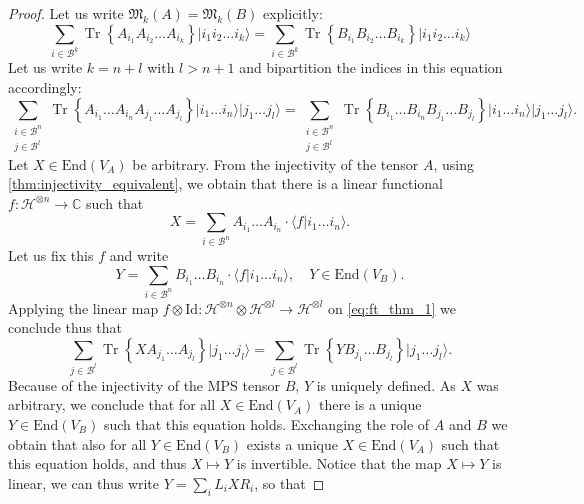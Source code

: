 \documentclass{article}
\newcommand{\tr}{\operatorname{Tr}}
\newcommand{\id}{\mathrm{Id}}
\newcommand{\End}{\mathrm{End}}
\newcommand{\ket}[1]{\vert #1 \rangle}
\newcommand{\scalprod}[2]{\langle #1 \vert #2 \rangle}
\begin{document}
\begin{proof}
  Let us write $\mathfrak{M}_k(A) = \mathfrak{M}_k(B)$ explicitly:
  \begin{equation*}
    \sum_{i\in \mathcal{B}^k} \tr\left\{A_{i_1} A_{i_2} \dots A_{i_k}\right\} \ket{i_1 i_2 \dots i_k} = 
    \sum_{i\in \mathcal{B}^k} \tr\left\{B_{i_1} B_{i_2} \dots B_{i_k}\right\} \ket{i_1 i_2 \dots i_k}
  \end{equation*}
  Let us write $k = n+l$ with $l>n+1$ and bipartition the indices in this equation accordingly:
  \begin{equation}\label{eq:ft_thm_1}
    \sum_{\substack{i\in \mathcal{B}^n\\j\in\mathcal{B}^l}} \tr\left\{A_{i_1} \dots A_{i_n} A_{j_1} \dots A_{j_l}\right\} \ket{i_1 \dots i_n} \ket{j_1 \dots j_l}= 
    \sum_{\substack{i\in \mathcal{B}^n\\j\in\mathcal{B}^l}} \tr\left\{B_{i_1} \dots B_{i_n} B_{j_1} \dots B_{j_l}\right\} \ket{i_1 \dots i_n} \ket{j_1 \dots j_l}.
  \end{equation}
  Let $X\in \End(V_A)$ be arbitrary. From the injectivity of the tensor $A$, using \cref{thm:injectivity_equivalent}, we obtain that there is a linear functional $f:\mathcal{H}^{\otimes n}\to \mathbb{C}$ such that 
  \begin{equation*}
    X = \sum_{i\in\mathcal{B}^n} A_{i_1} \dots A_{i_n} \cdot \scalprod{f}{i_1 \dots i_n}.
  \end{equation*}
  Let us fix this $f$ and write 
  \begin{equation*}
    Y = \sum_{i\in\mathcal{B}^n} B_{i_1} \dots B_{i_n} \cdot \scalprod{f}{i_1 \dots i_n}, \quad Y\in\End(V_B).
  \end{equation*}
  Applying the linear map $f\otimes\id: \mathcal{H}^{\otimes n} \otimes \mathcal{H}^{\otimes l} \to \mathcal{H}^{\otimes l}$ on \cref{eq:ft_thm_1} we conclude thus that
  \begin{equation*}
    \sum_{j\in\mathcal{B}^l} \tr\left\{X A_{j_1} \dots A_{j_l}\right\} \ket{j_1 \dots j_l}= 
    \sum_{j\in\mathcal{B}^l} \tr\left\{Y B_{j_1} \dots B_{j_l}\right\} \ket{j_1 \dots j_l}.
  \end{equation*}
  Because of the injectivity of the MPS tensor $B$, $Y$ is uniquely defined. As $X$ was arbitrary, we conclude that for all $X\in \End(V_A)$ there is a unique $Y\in \End(V_B)$ such that this equation holds. Exchanging the role of $A$ and $B$ we obtain that also for all $Y\in \End(V_B)$ exists a unique $X\in \End(V_A)$ such that this equation holds, and thus $X\mapsto Y$ is invertible. Notice that the map $X\mapsto Y$ is linear, we can thus write $Y = \sum_i L_i X R_i$, so that 

\end{proof}
\end{document}

